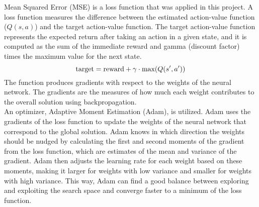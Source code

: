 \documentclass[letterpaper]{article} %
\begin{document}
Mean Squared Error (MSE) is a loss function that was applied in this project.
A loss function measures the difference between the estimated action-value function ($Q(s, a)$) and the target action-value function.
The target action-value function represents the expected return after taking an action in a given state, and it is computed as the sum of the immediate reward and gamma (discount factor) times the maximum value for the next state.
$$
\textnormal{target} = \textnormal{reward} + \gamma \cdot \textnormal{max}(Q(s', a'))
$$
The function produces gradients with respect to the weights of the neural network.
The gradients are the measures of how much each weight contributes to the overall solution using backpropagation.\\

An optimizer, Adaptive Moment Estimation (Adam), is utilized.
Adam uses the gradients of the loss function to update the weights of the neural network that correspond to the global solution.
Adam knows in which direction the weights should be nudged by calculating the first and second moments of the gradient from the loss function, which are estimates of the mean and variance of the gradient.
Adam then adjusts the learning rate for each weight based on these moments, making it larger for weights with low variance and smaller for weights with high variance.
This way, Adam can find a good balance between exploring and exploiting the search space and converge faster to a minimum of the loss function.
\end{document}
